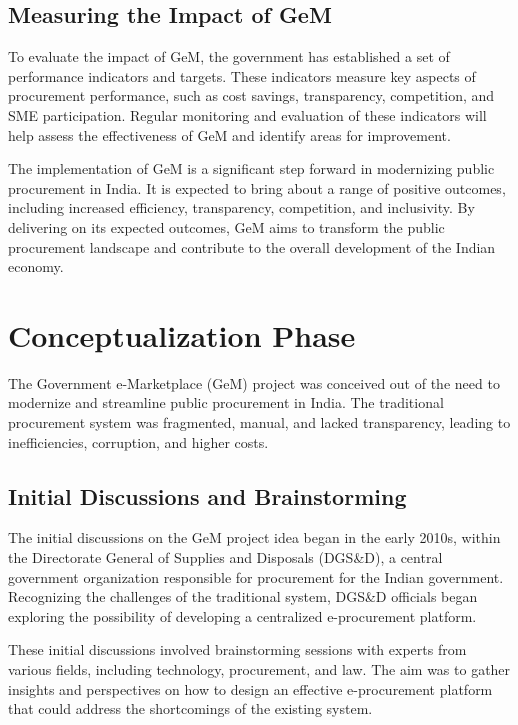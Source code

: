 \subsection{Measuring the Impact of GeM}

To evaluate the impact of GeM, the government has established a set of performance indicators and targets. These indicators measure key aspects of procurement performance, such as cost savings, transparency, competition, and SME participation. Regular monitoring and evaluation of these indicators will help assess the effectiveness of GeM and identify areas for improvement.

The implementation of GeM is a significant step forward in modernizing public procurement in India. It is expected to bring about a range of positive outcomes, including increased efficiency, transparency, competition, and inclusivity. By delivering on its expected outcomes, GeM aims to transform the public procurement landscape and contribute to the overall development of the Indian economy.

\section{Conceptualization Phase}
The Government e-Marketplace (GeM) project was conceived out of the need to modernize and streamline public procurement in India. The traditional procurement system was fragmented, manual, and lacked transparency, leading to inefficiencies, corruption, and higher costs.



\subsection{Initial Discussions and Brainstorming}

The initial discussions on the GeM project idea began in the early 2010s, within the Directorate General of Supplies and Disposals (DGS\&D), a central government organization responsible for procurement for the Indian government. Recognizing the challenges of the traditional system, DGS\&D officials began exploring the possibility of developing a centralized e-procurement platform.

These initial discussions involved brainstorming sessions with experts from various fields, including technology, procurement, and law. The aim was to gather insights and perspectives on how to design an effective e-procurement platform that could address the shortcomings of the existing system.

